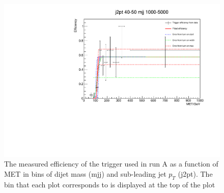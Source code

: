 \begin{figure}[h!]
\begin{center}
    \includegraphics[width=.6\largefigwidth]{plots/parked/trigfitplots/hData_MET_1D_25A.pdf}
    \caption{The measured efficiency of the trigger used in run A as a function of MET in bins of dijet mass (mjj) and sub-leading jet $p_{T}$ (j2pt). The bin that each plot corresponds to is displayed at the top of the plot}
    \label{fig:trigfitplotsA1}
  \end{center}
\end{figure}

